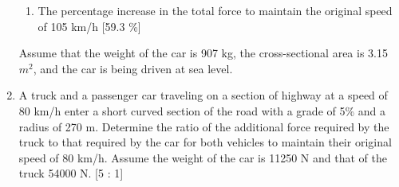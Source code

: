 \begin{enumerate}
\begin{enumerate}
			\item The percentage increase in the total force to maintain the original speed of 105 km/h [59.3 \%]
		\end{enumerate}
	Assume that the weight of the car is 907 kg, the cross-sectional area is 3.15 $ m^2 $, and the car is being driven at sea level.
	\item A truck and a passenger car traveling on a section of highway at a speed of 80 km/h enter a short curved section of the road with a grade of 5\% and a radius of 270 m. Determine the ratio of the additional force required by the truck to that required by the car for both vehicles to maintain their original speed of 80 km/h. Assume the weight of the car is 11250 N and that of the truck 54000 N. [5 : 1]
\end{enumerate}




